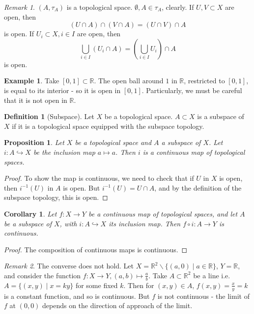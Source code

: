 \documentclass{article}
\theoremstyle{definition}
\newtheorem{defn}{Definition}[section]
\newtheorem{exmp}{Example}[section]
\theoremstyle{plain}%
\newtheorem{prop}[thm]{Proposition}
\newtheorem*{cor}{Corollary}
\theoremstyle{remark}
\newtheorem*{rem}{Remark}
\newcommand{\Union}{\bigcup}
\newcommand{\intersection}{\cap}
\newcommand{\injection}{\hookrightarrow}
\newcommand{\R}{\mathbb{R}}
\begin{document}
\begin{rem}
    $(A, \tau_A)$ is a topological space. $\emptyset, A \in \tau_A$, clearly. If $U, V \subset X$ are open, then
    \[(U \intersection A) \intersection (V \intersection A) = (U \intersection V) \intersection A\]
    is open. If $U_i \subset X, i \in I$ are open, then
    \[ \Union_{i \in I} (U_i \intersection A) = (\Union_{i\in I} U_i) \intersection A \]
    is open.
\end{rem}

\begin{exmp}
    Take $[0, 1] \subset \R$. The open ball around $1$ in $\R$, restricted to $[0, 1]$, is equal to its interior - so it is open in $[0,1]$. Particularly, we must be careful that it is not open in $\R$.
\end{exmp}

\begin{defn}[Subspace]
    Let $X$ be a topological space. $A \subset X$ is a subspace of $X$ if it is a topological space equipped with the subspace topology.
\end{defn}

\begin{prop}\label{inclusion map is continuous}
    Let $X$ be a topological space and $A$ a subspace of $X$. Let $i : A \injection X$ be the inclusion map $a \mapsto a$. Then $i$ is a continuous map of topological spaces.
\end{prop}

\begin{proof}
    To show the map is continuous, we need to check that if $U$ in $X$ is open, then $i^{-1}(U)$ in $A$ is open. But $i^{-1}(U) = U \intersection A$, and by the definition of the subspace topology, this is open.
\end{proof}

\begin{cor}
    Let $f : X \to Y$ be a continuous map of topological spaces, and let $A$ be a subspace of $X$, with $i: A \injection X$ its inclusion map. Then $ f \circ i : A \to Y $ is continuous.
\end{cor}

\begin{proof}
    The composition of continuous maps is continuous.
\end{proof}

\begin{rem}
    The converse does not hold. Let $X = \R^2 \backslash \{ (a, 0) \mid a \in \R \}$, $Y = \R$, and consider the function $f : X \to Y, (a, b) \mapsto \frac{a}{b}$. Take $A \subset \R^2$ be a line i.e. $A = \{ (x, y) \mid x = ky \}$ for some fixed $k$. Then for $(x, y) \in A$, $f(x, y) = \frac{x}{y} = k$ is a constant function, and so is continuous. But $f$ is not continuous - the limit of $f$ at $(0, 0)$ depends on the direction of approach of the limit.
\end{rem}
\end{document}
